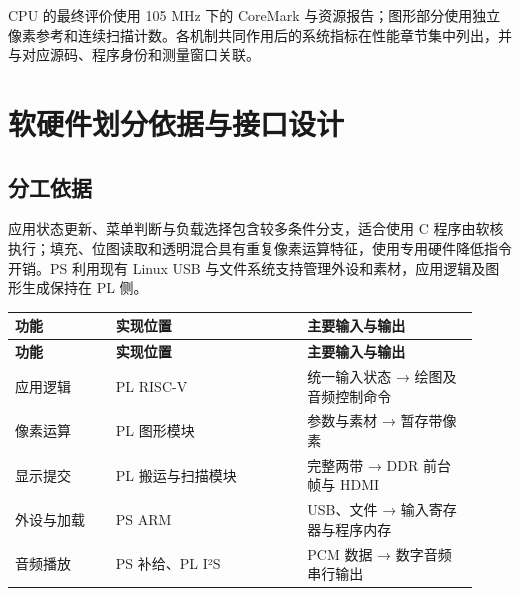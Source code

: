 \documentclass[UTF8,a4paper,12pt]{ctexart}
\begin{document}
CPU 的最终评价使用 105 MHz 下的 CoreMark 与资源报告；图形部分使用独立像素参考和连续扫描计数。各机制共同作用后的系统指标在性能章节集中列出，并与对应源码、程序身份和测量窗口关联。\par

\section{软硬件划分依据与接口设计}

\subsection{分工依据}

应用状态更新、菜单判断与负载选择包含较多条件分支，适合使用 C 程序由软核执行；填充、位图读取和透明混合具有重复像素运算特征，使用专用硬件降低指令开销。PS 利用现有 Linux USB 与文件系统支持管理外设和素材，应用逻辑及图形生成保持在 PL 侧。\par

{\small\setlength{\tabcolsep}{4pt}\renewcommand{\arraystretch}{1.3}

\begin{longtable}{>{\raggedright\arraybackslash}p{0.2\linewidth}>{\raggedright\arraybackslash}p{0.38\linewidth}>{\raggedright\arraybackslash}p{0.34\linewidth}}

\toprule

\textbf{功能} & \textbf{实现位置} & \textbf{主要输入与输出} \\ \midrule

\endfirsthead

\toprule

\textbf{功能} & \textbf{实现位置} & \textbf{主要输入与输出} \\ \midrule

\endhead

应用逻辑 & PL RISC-V & 统一输入状态 → 绘图及音频控制命令 \\

像素运算 & PL 图形模块 & 参数与素材 → 暂存带像素 \\

显示提交 & PL 搬运与扫描模块 & 完整两带 → DDR 前台帧与 HDMI \\

外设与加载 & PS ARM & USB、文件 → 输入寄存器与程序内存 \\

音频播放 & PS 补给、PL I²S & PCM 数据 → 数字音频串行输出 \\

\bottomrule

\end{longtable}

}
\end{document}
